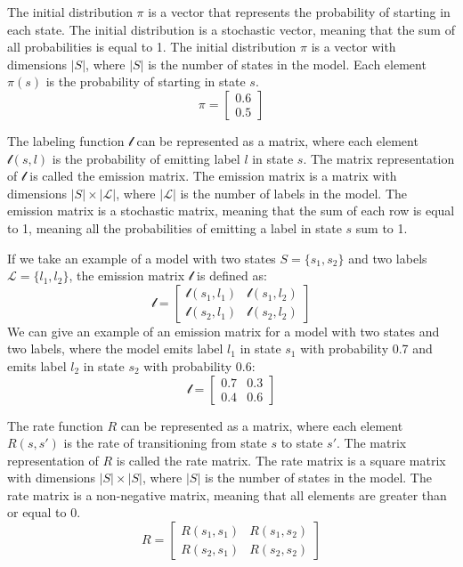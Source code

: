 The initial distribution $\pi$ is a vector that represents the probability of starting in each state. 
The initial distribution is a stochastic vector, meaning that the sum of all probabilities is equal to 1. 
The initial distribution $\pi$ is a vector with dimensions $|S|$, where $|S|$ is the number of states in the model. 
Each element $\pi(s)$ is the probability of starting in state $s$.
\begin{equation}
    \pi = \begin{bmatrix}
        0.6 \\
        0.5
    \end{bmatrix}
\end{equation}

The labeling function $\mathcal{l}$ can be represented as a matrix, where each element $\mathcal{l}(s, l)$ is the probability of emitting label $l$ in state $s$. 
The matrix representation of $\mathcal{l}$ is called the emission matrix. 
The emission matrix is a matrix with dimensions $|S| \times |\mathcal{L}|$, where $|\mathcal{L}|$ is the number of labels in the model.
The emission matrix is a stochastic matrix, meaning that the sum of each row is equal to 1, meaning all the probabilities of emitting a label in state $s$ sum to 1. 

If we take an example of a model with two states $S = \{s_1, s_2\}$ and two labels $\mathcal{L} = \{l_1, l_2\}$, the emission matrix $\mathcal{l}$ is defined as:
\begin{equation}
    \mathcal{l} = \begin{bmatrix}
        \mathcal{l}(s_1, l_1) & \mathcal{l}(s_1, l_2) \\
        \mathcal{l}(s_2, l_1) & \mathcal{l}(s_2, l_2)
    \end{bmatrix}
\end{equation}
We can give an example of an emission matrix for a model with two states and two labels, where the model emits label $l_1$ in state $s_1$ with probability 0.7 and emits label $l_2$ in state $s_2$ with probability 0.6:
\begin{equation}
    \mathcal{l} = \begin{bmatrix}
        0.7 & 0.3 \\
        0.4 & 0.6
    \end{bmatrix}
\end{equation}

The rate function $R$ can be represented as a matrix, where each element $R(s, s')$ is the rate of transitioning from state $s$ to state $s'$. 
The matrix representation of $R$ is called the rate matrix. 
The rate matrix is a square matrix with dimensions $|S| \times |S|$, where $|S|$ is the number of states in the model. 
The rate matrix is a non-negative matrix, meaning that all elements are greater than or equal to 0.
\begin{equation}
    R = \begin{bmatrix}
        R(s_1, s_1) & R(s_1, s_2) \\
        R(s_2, s_1) & R(s_2, s_2)
    \end{bmatrix}
\end{equation}


